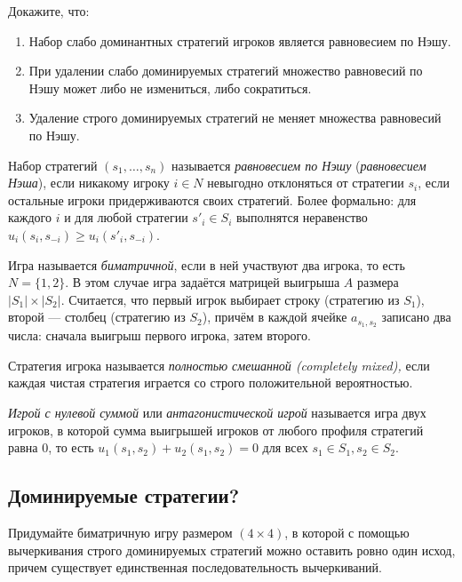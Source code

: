 \begin{problem} Докажите, что:
\begin{enumerate}
\item Набор слабо доминантных стратегий игроков является равновесием по Нэшу.
\item При удалении слабо доминируемых стратегий множество равновесий по Нэшу может либо не измениться, либо сократиться.
\item Удаление строго доминируемых стратегий не меняет множества равновесий по Нэшу.
\end{enumerate}
\end{problem}

Набор стратегий $(s_1,\ldots,s_n)$ называется {\it равновесием по Нэшу} ({\it равновесием Нэша}), если никакому игроку $i \in N$ невыгодно отклоняться от стратегии $s_i$, если остальные игроки придерживаются своих стратегий. Более формально: для каждого $i$ и для любой стратегии $s'_i \in S_i$ выполнятся неравенство $u_i(s_i,s_{-i}) \geq u_i(s'_i,s_{-i}).$

Игра называется \textit{биматричной}, если в ней участвуют два игрока, то есть $N = \{1,2\}$. В этом случае игра задаётся матрицей выигрыша $A$ размера $|S_1| \times |S_2|$. Считается, что первый игрок выбирает строку (стратегию из $S_1$), второй — столбец (стратегию из $S_2$), причём в каждой ячейке $a_{s_1,s_2}$ записано два числа: сначала выигрыш первого игрока, затем второго.

Стратегия игрока называется {\it полностью смешанной (completely mixed),} если каждая чистая стратегия играется со строго положительной вероятностью.

\textit{Игрой с нулевой суммой} или {\it антагонистической игрой} называется игра двух игроков, в которой сумма выигрышей игроков от любого профиля стратегий равна $0$, то есть $u_1(s_1,s_2)+u_2(s_1,s_2)=0$ для всех $s_1 \in S_1, s_2 \in S_2$.


\subsection{Доминируемые стратегии?}

\begin{problem}[Конструктор-4]
Придумайте биматричную игру размером  $\left(4\times 4\right)$, в которой с помощью вычеркивания строго доминируемых стратегий можно оставить ровно один исход, причем существует единственная последовательность вычеркиваний.
\begin{sol}
\end{sol}
\end{problem}

